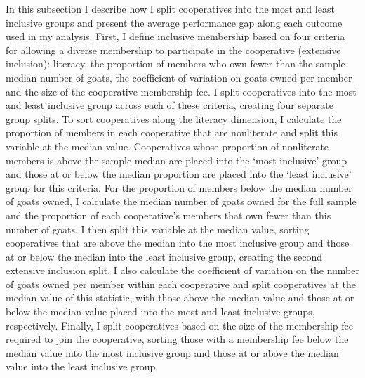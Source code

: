 \documentclass[11pt]{article}
\begin{document}
In this subsection I describe how I split cooperatives into the most and least inclusive groups and present the average performance gap along each outcome used in my analysis. First, I define inclusive membership based on four criteria for allowing a diverse membership to participate in the cooperative (extensive inclusion): literacy, the proportion of members who own fewer than the sample median number of goats, the coefficient of variation on goats owned per member and the size of the cooperative membership fee. I split cooperatives into the most and least inclusive group across each of these criteria, creating four separate group splits. To sort cooperatives along the literacy dimension, I calculate the proportion of members in each cooperative that are nonliterate and split this variable at the median value. Cooperatives whose proportion of nonliterate members is above the sample median are placed into the `most inclusive' group and those at or below the median proportion are placed into the `least inclusive' group for this criteria. For the proportion of members below the median number of goats owned, I calculate the median number of goats owned for the full sample and the proportion of each cooperative's members that own fewer than this number of goats. I then split this variable at the median value, sorting cooperatives that are above the median into the most inclusive group and those at or below the median into the least inclusive group, creating the second extensive inclusion split. I also calculate the coefficient of variation on the number of goats owned per member within each cooperative and split cooperatives at the median value of this statistic, with those above the median value and those at or below the median value placed into the most and least inclusive groups, respectively. Finally, I split cooperatives based on the size of the membership fee required to join the cooperative, sorting those with a membership fee below the median value into the most inclusive group and those at or above the median value into the least inclusive group. 
\end{document}
